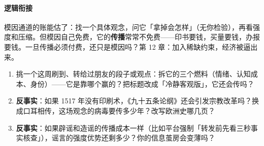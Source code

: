 \documentclass[../../main2.tex]{subfiles}
\begin{document}
\paragraph*{逻辑衔接}
	模因通道的账能估了：找一个具体观念，问它「拿掉会怎样」（无你检验），再看强度和压缩。但模因自己免费，它的\textbf{传播}常常不免费——印书要钱，买量要钱，办报要钱。一旦传播必须付费，还只是模因吗？第 12 章：加入稀缺约束，经济被逼出来。

\begin{thinkbox}
\begin{enumerate}
	\item 挑一个这周刷到、转给过朋友的段子或观点：拆它的三个燃料（情绪、认知成本、身份）——它是靠哪个赢的？把标题改成「冷静客观版」，它还会传吗？
	\item \textbf{反事实}：如果 1517 年没有印刷术，《九十五条论纲》还会引发宗教改革吗？换成口耳相传，这场观念的病毒要传多少年？改写欧洲史哪几页？
	\item \textbf{反事实}：如果辟谣和造谣的传播成本一样（比如平台强制「转发前先看三秒事实核查」），谣言的强度优势还剩多少？你的信息茧房会变薄吗？
\end{enumerate}
\end{thinkbox}
\end{document}
